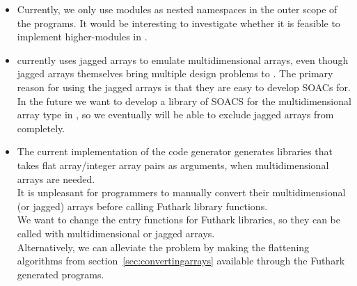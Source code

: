 \begin{itemize}
\item Currently, we only use modules as nested namespaces in the outer scope of
  the \fshark{} programs. It would be interesting to investigate whether it is
  feasible to implement higher-modules in \fshark{}.

\item \fshark{} currently uses jagged arrays to emulate multidimensional
  arrays, even though jagged arrays themselves bring multiple design problems to
  \fshark{}. The primary reason for using the jagged arrays is that they are easy to develop SOACs for.
  In the future we want to develop a library of SOACS for the
  multidimensional array type in \fsharp{}, so we eventually will be able to
  exclude jagged arrays from \fshark{} completely.

\item The current implementation of the \csharp{} code generator generates
  \csharp{} libraries that takes flat array/integer array pairs as arguments,
  when multidimensional arrays are needed.\\
  It is unpleasant for programmers to manually convert their multidimensional (or jagged) arrays
  before calling Futhark library functions.\\
  We want to change the entry functions for Futhark \csharp{} libraries, so they
  can be called with multidimensional or jagged arrays.
  \\
  Alternatively, we can alleviate the problem by making the flattening algorithms from
  section~\ref{sec:convertingarrays} available through the Futhark generated
  \csharp{} programs.

  
\end{itemize}



